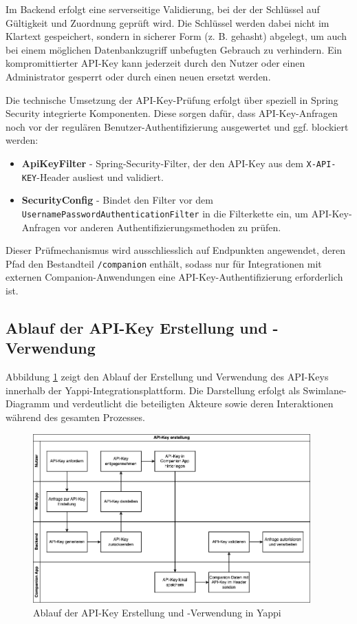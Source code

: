 \documentclass[12pt,a4paper]{report}
\begin{document}
Im Backend erfolgt eine serverseitige Validierung, bei der der Schlüssel auf Gültigkeit und Zuordnung geprüft wird. Die Schlüssel
werden dabei nicht im Klartext gespeichert, sondern in sicherer Form (z. B. gehasht) abgelegt, um auch bei einem möglichen
Datenbankzugriff unbefugten Gebrauch zu verhindern. Ein kompromittierter API-Key kann jederzeit durch den Nutzer oder einen
Administrator gesperrt oder durch einen neuen ersetzt werden.

Die technische Umsetzung der API-Key-Prüfung erfolgt über speziell in Spring Security integrierte Komponenten. Diese sorgen dafür,
dass API-Key-Anfragen noch vor der regulären Benutzer-Authentifizierung ausgewertet und ggf. blockiert werden:

\begin{itemize}
  \item \textbf{ApiKeyFilter} - Spring-Security-Filter, der den API-Key aus dem \texttt{X-API-KEY}-Header ausliest und validiert.
  \item \textbf{SecurityConfig} - Bindet den Filter vor dem \texttt{UsernamePasswordAuthenticationFilter} in die Filterkette ein,
    um API-Key-Anfragen vor anderen Authentifizierungsmethoden zu prüfen.
\end{itemize}

Dieser Prüfmechanismus wird ausschliesslich auf Endpunkten angewendet, deren Pfad den Bestandteil \texttt{/companion} enthält, 
sodass nur für Integrationen mit externen Companion-Anwendungen eine API-Key-Authentifizierung erforderlich ist.

\subsection{Ablauf der API-Key Erstellung und -Verwendung}

Abbildung \ref{fig:apikey-swimlane} zeigt den Ablauf der Erstellung und Verwendung des API-Keys innerhalb der
Yappi-Integrationsplattform. Die Darstellung erfolgt als Swimlane-Diagramm und verdeutlicht die beteiligten Akteure sowie deren
Interaktionen während des gesamten Prozesses.

\begin{figure}[H]
  \centering
  \includegraphics[width=0.95\textwidth]{../figures/apikey-swimlane-diagram.drawio.png}
  \caption{Ablauf der API-Key Erstellung und -Verwendung in Yappi}
  \label{fig:apikey-swimlane}
\end{figure}
\end{document}
